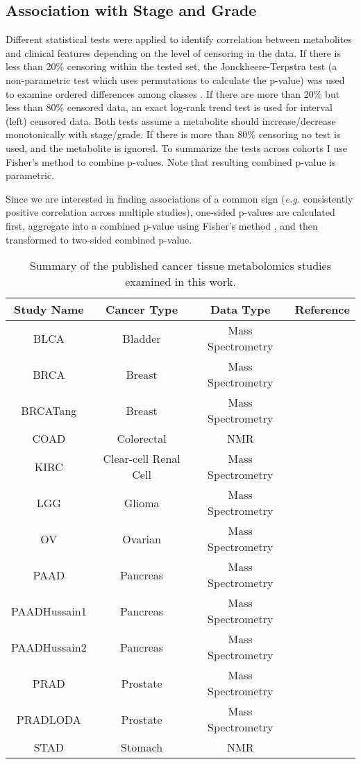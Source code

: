 \documentclass[10pt]{article}
\newcommand{\beginsupplement}{%
        \setcounter{table}{0}
        \renewcommand{\thetable}{S\arabic{table}}%
        \setcounter{figure}{0}
        \renewcommand{\thefigure}{S\arabic{figure}}%
     }
\begin{document}
\subsection{Association with Stage and Grade}
Different statistical tests were applied to identify correlation between metabolites and clinical features depending on the level of censoring in the data. If there is less than 20\% censoring within the tested set, the Jonckheere-Terpstra test (a non-parametric test which uses permutations to calculate the p-value) was used to examine ordered differences among classes . If there are more than 20\% but less than 80\% censored data, an exact log-rank trend test is used for interval (left) censored data. Both tests assume a metabolite should increase/decrease monotonically with stage/grade.  If there is more than 80\% censoring no test is used, and the metabolite is ignored. To summarize the tests across cohorts I use Fisher’s method to combine p-values. Note that resulting combined p-value is parametric. 

Since we are interested in finding associations of a common sign (\textit{e.g.} consistently positive correlation across multiple studies), one-sided p-values are calculated first, aggregate into a combined p-value using Fisher's method \cite{Whitlock2005}, and then transformed to two-sided combined p-value.




\beginsupplement
\newpage

\begin{table}
\centering
\begin{tabular}{ c c c c }
  \textbf{Study Name} & \textbf{Cancer Type} & Data Type & \textbf{Reference}  \\
  \hline
  BLCA & Bladder & Mass Spectrometry & \cite{Putluri2011} \\
  BRCA & Breast & Mass Spectrometry & \cite{Terunuma2014} \\
  BRCATang & Breast & Mass Spectrometry & \cite{Tang2014} \\
  COAD & Colorectal & NMR & \cite{Hirayama2009} \\
  KIRC & Clear-cell Renal Cell & Mass Spectrometry & \cite{Hakimi2015} \\
  LGG & Glioma & Mass Spectrometry & \cite{Chinnaiyan2012} \\
  OV & Ovarian & Mass Spectrometry & \cite{Fong2011} \\
  PAAD & Pancreas & Mass Spectrometry & \cite{Kamphorst2015} \\
  PAADHussain1 & Pancreas & Mass Spectrometry & \cite{Zhang2013} \\
  PAADHussain2 & Pancreas & Mass Spectrometry & \cite{Zhang2013} \\
  PRAD & Prostate & Mass Spectrometry & \cite{Sreekumar2009} \\
  PRADLODA & Prostate & Mass Spectrometry & \cite{Priolo2014} \\
  STAD & Stomach & NMR & \cite{Hirayama2009}
\end{tabular}
\caption{Summary of the published cancer tissue metabolomics studies examined in this work.}
\label{table:SITab_Studies}
\end{table}
\end{document}
